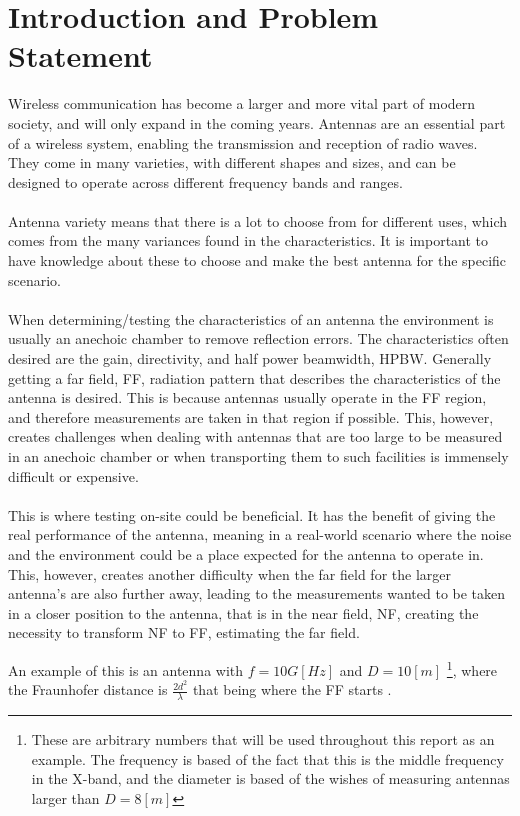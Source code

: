 \chapter{Introduction and Problem Statement} \label{section:initialProblem}

Wireless communication has become a larger and more vital part of modern society, and will only expand in the coming years.
Antennas are an essential part of a wireless system, enabling the transmission and reception of radio waves. They come in many varieties, with different shapes and sizes, and can be designed to operate across different frequency bands and ranges.
\\
\\
Antenna variety means that there is a lot to choose from for different uses, which comes from the many variances found in the characteristics. It is important to have knowledge about these to choose and make the best antenna for the specific scenario.
\\
\\
When determining/testing the characteristics of an antenna the environment is usually an anechoic chamber to remove reflection errors. The characteristics often desired are the gain, directivity, and half power beamwidth, \gls{HPBW}. Generally getting a far field, \gls{FF}, radiation pattern that describes the characteristics of the antenna is desired. This is because antennas usually operate in the \gls{FF} region, and therefore measurements are taken in that region if possible. This, however, creates challenges when dealing with antennas that are too large to be measured in an anechoic chamber or when transporting them to such facilities is immensely difficult or expensive.
\\
\\
This is where testing on-site could be beneficial. It has the benefit of giving the real performance of the antenna, meaning in a real-world scenario where the noise and the environment could be a place expected for the antenna to operate in.
This, however, creates another difficulty when the far field for the larger antenna's are also further away, leading to the measurements wanted to be taken in a closer position to the antenna, that is in the near field, \gls{NF}, creating the necessity to transform \gls{NF} to \gls{FF}, estimating the far field.

An example of this is an antenna with $f= 10 G[Hz] $ and $ D = 10 [m]$ \footnote{These are arbitrary numbers that will be used throughout this report as an example. The frequency is based of the fact that this is the middle frequency in the X-band, and the diameter is based of the wishes of measuring antennas larger than $D=8[m]$}, where the Fraunhofer distance is $ \frac{2 d^2}{\lambda}$ that being where the \gls{FF} starts \cite{balanis}. 

